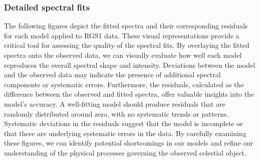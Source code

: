 			\subsubsection*{Detailed spectral fits}
				The following figures depict the fitted spectra and their corresponding residuals for each model applied to RGS1 data. These visual representations provide a critical tool for assessing the quality of the spectral fits. By overlaying the fitted spectra onto the observed data, we can visually evaluate how well each model reproduces the overall spectral shape and intensity. Deviations between the model and the observed data may indicate the presence of additional spectral components or systematic errors. Furthermore, the residuals, calculated as the difference between the observed and fitted spectra, offer valuable insights into the model's accuracy. A well-fitting model should produce residuals that are randomly distributed around zero, with no systematic trends or patterns. Systematic deviations in the residuals suggest that the model is incomplete or that there are underlying systematic errors in the data. By carefully examining these figures, we can identify potential shortcomings in our models and refine our understanding of the physical processes governing the observed celestial object.
